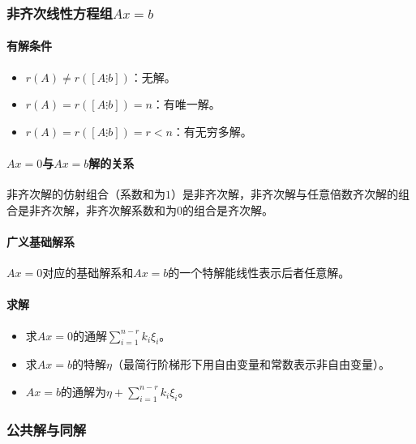 \documentclass[
12pt, %
a4paper, 
oneside, %
headinclude,footinclude, %
]{scrartcl}
\begin{document}
\subsubsection[非齐次线性方程组]{非齐次线性方程组$ Ax = b $}
\paragraph{有解条件}
\begin{itemize}
\item $ r(A) \neq r([A \vdots b]) $：无解。
\item $ r(A) = r([A \vdots b]) = n $：有唯一解。
\item $ r(A) = r([A \vdots b]) = r < n $：有无穷多解。
\end{itemize}
\paragraph{$ Ax = 0 $与$ Ax = b $解的关系}
非齐次解的仿射组合（系数和为$ 1 $）是非齐次解，非齐次解与任意倍数齐次解的组合是非齐次解，非齐次解系数和为$ 0 $的组合是齐次解。
\paragraph{广义基础解系}
$ Ax = 0 $对应的基础解系和$ Ax = b $的一个特解能线性表示后者任意解。
\paragraph{求解}
\begin{itemize}
\item 求$ Ax = 0 $的通解$ \sum_{i = 1}^{n - r} k_i \xi_i $。
\item 求$ Ax = b $的特解$ \eta $（最简行阶梯形下用自由变量和常数表示非自由变量）。
\item $ Ax = b $的通解为$ \eta + \sum_{i = 1}^{n - r} k_i \xi_i $。
\end{itemize}
\subsubsection[公共解与同解]{公共解与同解}
\end{document}
